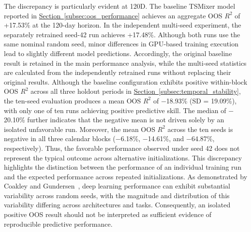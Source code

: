 \documentclass[runningheads,orivec]{llncs}
\begin{document}
The discrepancy is particularly evident at 120D. The baseline TSMixer model reported in \hyperref[subsec:oos_performance]{Section~\ref*{subsec:oos_performance}} achieves an aggregate OOS $R^2$ of +17.53\% at the 120-day horizon. In the independent multi-seed experiment, the separately retrained seed-42 run achieves +17.48\%. Although both runs use the same nominal random seed, minor differences in GPU-based training execution lead to slightly different model predictions. Accordingly, the original baseline result is retained in the main performance analysis, while the multi-seed statistics are calculated from the independently retrained runs without replacing their original results. Although the baseline configuration exhibits positive within-block OOS $R^2$ across all three holdout periods in \hyperref[subsec:temporal_stability]{Section~\ref*{subsec:temporal_stability}}, the ten-seed evaluation produces a mean OOS $R^2$ of $-$18.93\% (SD = 19.09\%), with only one of ten runs achieving positive predictive skill. The median of $-$20.10\% further indicates that the negative mean is not driven solely by an isolated unfavorable run. Moreover, the mean OOS $R^2$ across the ten seeds is negative in all three calendar blocks ($-$6.18\%, $-$14.61\%, and $-$64.87\%, respectively). Thus, the favorable performance observed under seed 42 does not represent the typical outcome across alternative initializations. This discrepancy highlights the distinction between the performance of an individual training run and the expected performance across repeated initializations. As demonstrated by Coakley and Gundersen~\cite{coakley2026}, deep learning performance can exhibit substantial variability across random seeds, with the magnitude and distribution of this variability differing across architectures and tasks. Consequently, an isolated positive OOS result should not be interpreted as sufficient evidence of reproducible predictive performance.
\end{document}
